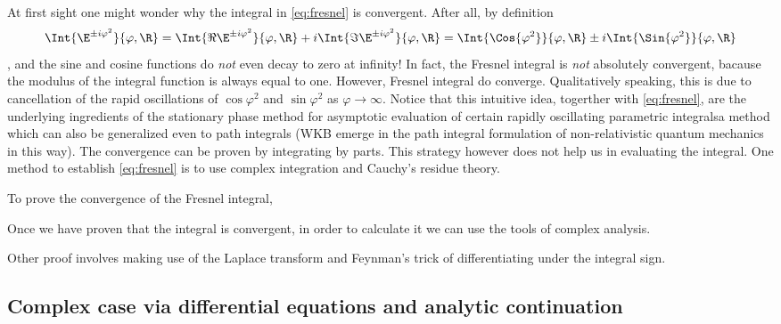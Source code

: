 At first sight one might wonder why the integral in \cref{eq:fresnel} is convergent.
After all, 
by definition
\begin{dmath*}
   \Int{ \E^{\pm i\varphi^{2}}}{\varphi,\R} 
   = 
   \Int{ \Re \E^{\pm i\varphi^{2}}}{\varphi,\R} + i 
   \Int{ \Im \E^{\pm i\varphi^{2}}}{\varphi,\R} 
   = 
   \Int{ \Cos{\varphi^{2}}}{\varphi,\R} \pm i 
   \Int{ \Sin{\varphi^{2}}}{\varphi,\R} 
\end{dmath*},
and the sine and cosine functions do \emph{not} even decay to zero at infinity!
In fact, the Fresnel integral is \emph{not} absolutely
convergent, bacause the modulus of the integral function is always equal to
one. However, Fresnel integral do converge.
Qualitatively speaking, this is due to cancellation of the rapid oscillations of $\cos
\varphi^{2}$ and $\sin\varphi^{2}$ as $\varphi\rightarrow\infty$.
Notice that this intuitive idea, togerther with 
\cref{eq:fresnel}, are the underlying ingredients of the stationary phase method for
asymptotic evaluation of certain rapidly oscillating parametric
integrals\textemdash a
method which can also be generalized even to path integrals (WKB emerge in the path
integral formulation of non-relativistic quantum mechanics in this
way).
The convergence can be proven by integrating by parts. This
strategy however does not help us in evaluating the integral.
One method to establish \cref{eq:fresnel} is to use complex integration and
Cauchy's residue theory.

To prove  the convergence of the Fresnel integral, 

Once we have proven that the integral is convergent, in order to calculate it
we can use the tools of complex analysis.

\begin{sidefigure}
   \caption{%
      \label{fig:fresnel}}
\end{sidefigure}

Other proof  involves making use of the
Laplace transform and Feynman's trick of differentiating under the integral
sign.



\subsection{Complex case via differential equations and analytic continuation} 
\label{sec:complex case}

